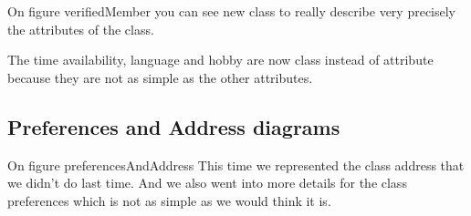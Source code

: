 \documentclass[11pt, a4paper]{article}   	%
\begin{document}

On figure {verifiedMember} you can see new class to really describe very precisely the attributes of the class.

The time availability, language and hobby are now class instead of attribute because they are not as simple as the other
attributes. 

\subsection{Preferences and Address diagrams}


On figure {preferencesAndAddress} This time we represented the class address that we didn't do last time. And we also went into more details
for the class preferences which is not as simple as we would think it is.
\end{document}
